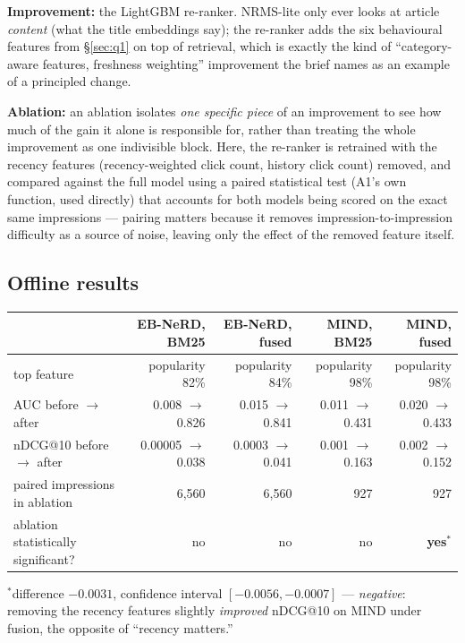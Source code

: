\documentclass[11pt,a4paper]{article}
\begin{document}
\textbf{Improvement:} the LightGBM re-ranker. NRMS-lite only ever looks at article \emph{content}
(what the title embeddings say); the re-ranker adds the six behavioural features from
\S\ref{sec:q1} on top of retrieval, which is exactly the kind of ``category-aware features,
freshness weighting'' improvement the brief names as an example of a principled change.

\textbf{Ablation:} an ablation isolates \emph{one specific piece} of an improvement to see how
much of the gain it alone is responsible for, rather than treating the whole improvement as one
indivisible block. Here, the re-ranker is retrained with the recency features (recency-weighted
click count, history click count) removed, and compared against the full model using a paired
statistical test (A1's own function, used directly) that accounts for both models being scored on
the exact same impressions --- pairing matters because it removes impression-to-impression
difficulty as a source of noise, leaving only the effect of the removed feature itself.

\subsection{Offline results}

\begin{center}
\begin{tabular}{@{}lrrrr@{}}
\toprule
 & \textbf{EB-NeRD, BM25} & \textbf{EB-NeRD, fused} & \textbf{MIND, BM25} & \textbf{MIND, fused} \\
\midrule
top feature & popularity 82\% & popularity 84\% & popularity 98\% & popularity 98\% \\
AUC before $\to$ after & 0.008 $\to$ 0.826 & 0.015 $\to$ 0.841 & 0.011 $\to$ 0.431 & 0.020 $\to$ 0.433 \\
nDCG@10 before $\to$ after & 0.00005 $\to$ 0.038 & 0.0003 $\to$ 0.041 & 0.001 $\to$ 0.163 & 0.002 $\to$ 0.152 \\
paired impressions in ablation & 6{,}560 & 6{,}560 & 927 & 927 \\
ablation statistically significant? & no & no & no & \textbf{yes}$^{*}$ \\
\bottomrule
\end{tabular}
\end{center}

{\small $^{*}$difference $-0.0031$, confidence interval $[-0.0056, -0.0007]$ --- \emph{negative}:
removing the recency features slightly \emph{improved} nDCG@10 on MIND under fusion, the opposite
of ``recency matters.''}
\end{document}
